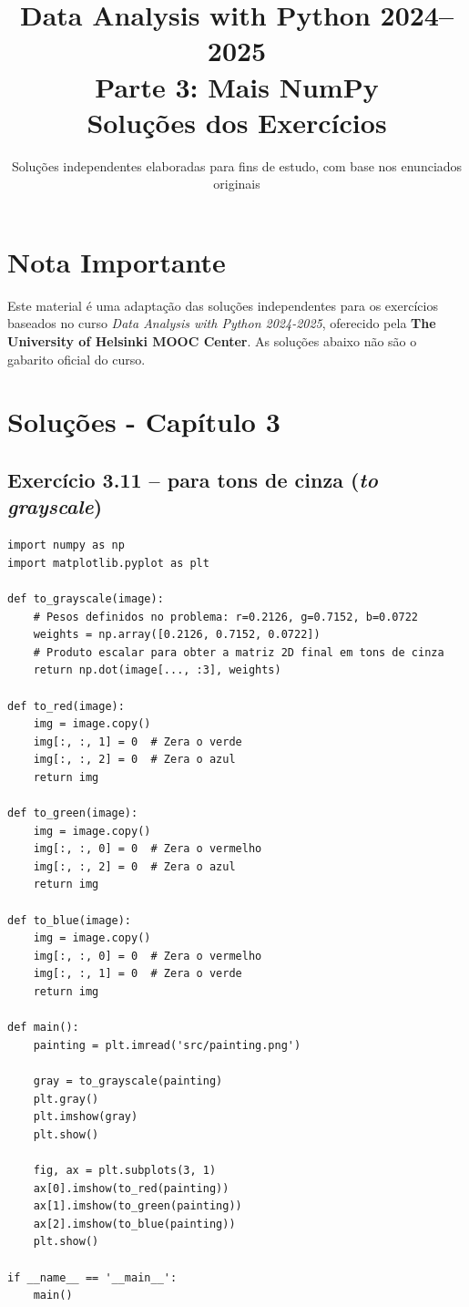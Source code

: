 \documentclass[11pt,a4paper]{article}
\title{\textbf{Data Analysis with Python 2024--2025}\\Parte 3: Mais NumPy\\\large Soluções dos Exercícios}
\author{Soluções independentes elaboradas para fins de estudo, com base nos enunciados originais}
\date{}
\begin{document}
\maketitle

\section*{Nota Importante}
Este material é uma adaptação das soluções independentes para os exercícios baseados no curso \textit{Data Analysis with Python 2024-2025}, oferecido pela \textbf{The University of Helsinki MOOC Center}. As soluções abaixo não são o gabarito oficial do curso.

\tableofcontents
\newpage

\section{Soluções - Capítulo 3}

\subsection*{Exercício 3.11 -- para tons de cinza (\textit{to grayscale})}

\begin{solucao}
\begin{lstlisting}
import numpy as np
import matplotlib.pyplot as plt

def to_grayscale(image):
    # Pesos definidos no problema: r=0.2126, g=0.7152, b=0.0722
    weights = np.array([0.2126, 0.7152, 0.0722])
    # Produto escalar para obter a matriz 2D final em tons de cinza
    return np.dot(image[..., :3], weights)

def to_red(image):
    img = image.copy()
    img[:, :, 1] = 0  # Zera o verde
    img[:, :, 2] = 0  # Zera o azul
    return img

def to_green(image):
    img = image.copy()
    img[:, :, 0] = 0  # Zera o vermelho
    img[:, :, 2] = 0  # Zera o azul
    return img

def to_blue(image):
    img = image.copy()
    img[:, :, 0] = 0  # Zera o vermelho
    img[:, :, 1] = 0  # Zera o verde
    return img

def main():
    painting = plt.imread('src/painting.png')
    
    gray = to_grayscale(painting)
    plt.gray()
    plt.imshow(gray)
    plt.show()

    fig, ax = plt.subplots(3, 1)
    ax[0].imshow(to_red(painting))
    ax[1].imshow(to_green(painting))
    ax[2].imshow(to_blue(painting))
    plt.show()

if __name__ == '__main__':
    main()
\end{lstlisting}
\end{solucao}
\end{document}
